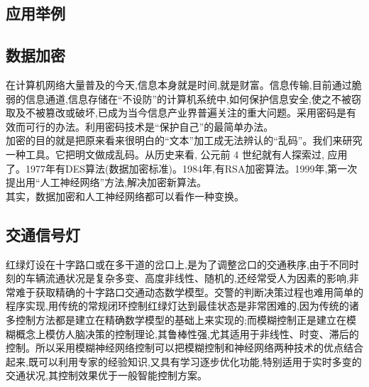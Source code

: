 \documentclass[a4paper,12pt]{article}
\begin{document}
\begin{CJK*}{UTF8}{gbsn}

	\section{应用举例}
	\subsection{数据加密}
	在计算机网络大量普及的今天,信息本身就是时间,就是财富。信息传输,目前通过脆弱的信息通道,信息存储在“不设防”的计算机系统中,如何保护信息安全,使之不被窃取及不被篡改或破坏,已成为当今信息产业界普遍关注的重大问题。采用密码是有效而可行的办法。利用密码技术是“保护自己”的最简单办法。\\
加密的目的就是把原来看来很明白的“文本”加工成无法辨认的“乱码”。我们来研究一种工具。它把明文做成乱码。从历史来看, 公元前 4 世纪就有人探索过, 应用了。1977年有DES算法(数据加密标准)。1984年,有RSA加密算法。1999年,第一次提出用“人工神经网络”方法,解决加密新算法。\\
其实，数据加密和人工神经网络都可以看作一种变换。
	\subsection{交通信号灯}
	红绿灯设在十字路口或在多干道的岔口上,是为了调整岔口的交通秩序,由于不同时刻的车辆流通状况是复杂多变、高度非线性、随机的,还经常受人为因素的影响,非常难于获取精确的十字路口交通动态数学模型。交警的判断决策过程也难用简单的程序实现,用传统的常规闭环控制红绿灯达到最佳状态是非常困难的,因为传统的诸多控制方法都是建立在精确数学模型的基础上来实现的;而模糊控制正是建立在模糊概念上模仿人脑决策的控制理论,其鲁棒性强,尤其适用于非线性、时变、滞后的控制。所以采用模糊神经网络控制可以把模糊控制和神经网络两种技术的优点结合起来,既可以利用专家的经验知识,又具有学习逐步优化功能,特别适用于实时多变的交通状况,其控制效果优于一般智能控制方案。

\end{CJK*}
\end{document}
